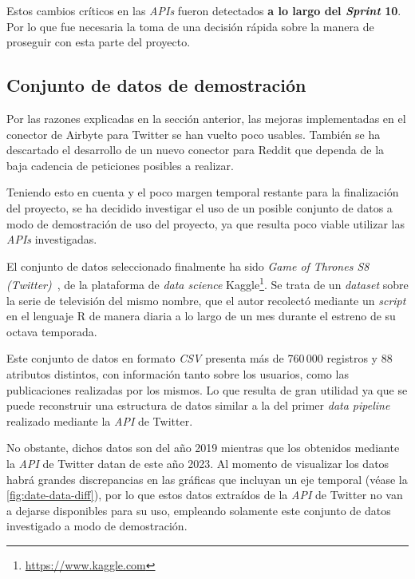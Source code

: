 Estos cambios críticos en las \textit{APIs} fueron detectados \textbf{a lo largo del \textit{Sprint} 10}. Por lo que fue necesaria la toma de una decisión rápida sobre la manera de proseguir con esta parte del proyecto.

\subsection{Conjunto de datos de demostración}

Por las razones explicadas en la sección anterior, las mejoras implementadas en el conector de Airbyte para Twitter se han vuelto poco usables. También se ha descartado el desarrollo de un nuevo conector para Reddit que dependa de la baja cadencia de peticiones posibles a realizar.

Teniendo esto en cuenta y el poco margen temporal restante para la finalización del proyecto, se ha decidido investigar el uso de un posible conjunto de datos a modo de demostración de uso del proyecto, ya que resulta poco viable utilizar las \textit{APIs} investigadas.

El conjunto de datos seleccionado finalmente ha sido \textit{Game of Thrones S8 (Twitter)}~\cite{got8}, de la plataforma de \textit{data science} Kaggle\footnote{\url{https://www.kaggle.com}}. Se trata de un \textit{dataset} sobre la serie de televisión del mismo nombre, que el autor recolectó mediante un \textit{script} en el lenguaje R de manera diaria a lo largo de un mes durante el estreno de su octava temporada.

Este conjunto de datos en formato \textit{CSV} presenta más de 760\,000 registros y 88 atributos distintos, con información tanto sobre los usuarios, como las publicaciones realizadas por los mismos. Lo que resulta de gran utilidad ya que se puede reconstruir una estructura de datos similar a la del primer \textit{data pipeline} realizado mediante la \textit{API} de Twitter.

No obstante, dichos datos son del año 2019 mientras que los obtenidos mediante la \textit{API} de Twitter datan de este año 2023. Al momento de visualizar los datos habrá grandes discrepancias en las gráficas que incluyan un eje temporal (véase la \autoref{fig:date-data-diff}), por lo que estos datos extraídos de la \textit{API} de Twitter no van a dejarse disponibles para su uso, empleando solamente este conjunto de datos investigado a modo de demostración.


